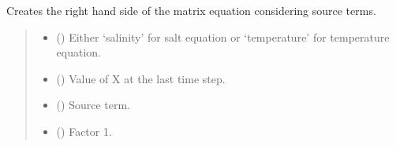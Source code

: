 \documentclass[a4paper,11pt,english,openany]{sphinxmanual}
\begin{document}
\begin{fulllineitems}
\label{\detokenize{api/spyice.rhs:src.spyice.rhs.apply_boundary_condition}}
\pysigstartsignatures
\pysiglinewithargsret
{}
{\sphinxparamcomma {}\sphinxparamcomma {}\sphinxparamcomma {}\sphinxparamcomma {}\sphinxparamcomma {}\sphinxparamcomma {}\sphinxparamcomma {}\sphinxparamcomma {}\sphinxparamcomma {}\sphinxparamcomma {}\sphinxparamcomma {}\sphinxparamcomma {}\sphinxparamcomma {}\sphinxparamcomma {}\sphinxparamcomma {}}
{}
\pysigstopsignatures
\sphinxAtStartPar
Creates the right hand side of the matrix equation considering source terms.
\begin{quote}\begin{description}
\begin{itemize}
\item {} 
\sphinxAtStartPar
{} () \textendash{} Either ‘salinity’ for salt equation or ‘temperature’ for temperature equation.

\item {} 
\sphinxAtStartPar
{} () \textendash{} Value of X at the last time step.

\item {} 
\sphinxAtStartPar
{} () \textendash{} Source term.

\item {} 
\sphinxAtStartPar
{} () \textendash{} Factor 1.


\end{itemize}
\end{description}
\end{quote}
\end{fulllineitems}
\end{document}

